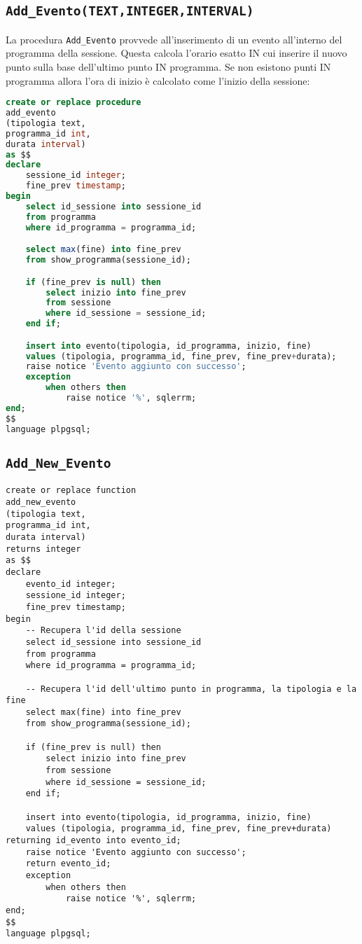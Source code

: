 \subsection{\texttt{Add\_Evento(TEXT,INTEGER,INTERVAL)}}
La procedura \texttt{Add\_Evento} provvede all'inserimento di un evento all'interno del programma della sessione. Questa calcola l'orario esatto IN cui inserire il nuovo punto sulla base dell'ultimo punto IN programma. Se non esistono punti IN programma allora l'ora di inizio è calcolato come l'inizio della sessione:
\begin{lstlisting}[language=SQL,style=mystyle]
create or replace procedure 
add_evento
(tipologia text, 
programma_id int, 
durata interval)
as $$
declare
    sessione_id integer;
    fine_prev timestamp;
begin
    select id_sessione into sessione_id
    from programma
    where id_programma = programma_id;

    select max(fine) into fine_prev
    from show_programma(sessione_id);

    if (fine_prev is null) then
        select inizio into fine_prev
        from sessione
        where id_sessione = sessione_id;
    end if;

    insert into evento(tipologia, id_programma, inizio, fine)
    values (tipologia, programma_id, fine_prev, fine_prev+durata);
    raise notice 'Evento aggiunto con successo';
    exception
        when others then
            raise notice '%', sqlerrm;
end;
$$
language plpgsql;
\end{lstlisting}
\subsection{\texttt{Add\_New\_Evento}}
\begin{lstlisting}
create or replace function
add_new_evento
(tipologia text, 
programma_id int, 
durata interval)
returns integer
as $$
declare
    evento_id integer;
    sessione_id integer;
    fine_prev timestamp;
begin
    -- Recupera l'id della sessione
    select id_sessione into sessione_id
    from programma
    where id_programma = programma_id;

    -- Recupera l'id dell'ultimo punto in programma, la tipologia e la fine
    select max(fine) into fine_prev
    from show_programma(sessione_id);

    if (fine_prev is null) then
        select inizio into fine_prev
        from sessione
        where id_sessione = sessione_id;
    end if;

    insert into evento(tipologia, id_programma, inizio, fine)
    values (tipologia, programma_id, fine_prev, fine_prev+durata) returning id_evento into evento_id;
    raise notice 'Evento aggiunto con successo';
    return evento_id;
    exception
        when others then
            raise notice '%', sqlerrm;
end;
$$
language plpgsql;
\end{lstlisting}

